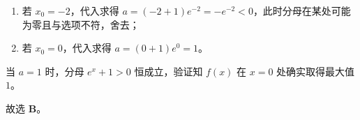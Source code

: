 {  \begin{enumerate}[leftmargin=2em, label=(\arabic*), itemsep=0.3em, topsep=0.3em]
    \item 若 \(x_0 = -2\)，代入求得 \(a = (-2 + 1)e^{-2} = -e^{-2} < 0\)，此时分母在某处可能为零且与选项不符，舍去；
    \item 若 \(x_0 = 0\)，代入求得 \(a = (0 + 1)e^0 = 1\)。
  \end{enumerate}

  当 \(a = 1\) 时，分母 \(e^x + 1 > 0\) 恒成立，验证知 \(f(x)\) 在 \(x = 0\) 处确实取得最大值 \(1\)。\par\vspace{0.2em}

  故选 \textbf{B}。%
}

\newcommand{\qFuncMaxValParameterDiagnosis}{%
  学生在对商的求导法则进行计算时容易出现符号混乱，特别是在合并分子时漏掉括号。此外，部分学生面对两个方程联立时可能感到无从下手，需要掌握消元（消去参数 \(a\)）的解题策略。特别要注意，“最大值为1”蕴含充分与必要两个方面，不仅要求函数值小于等于1，还必须保证有取等点。%
}

\newcommand{\qFuncMaxValParameterTeachingNotes}{%
  本题是一道精妙的导数选填题。解题突破口在于“最值点”的双重性质——即函数值等于最值，且在该点导数（极值点）为 0。联立消元是常见的代数变形技巧，讲评时应重点拆解这一联立过程。%
}
